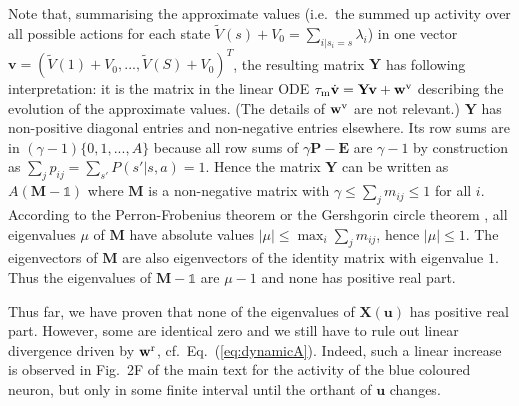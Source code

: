 \documentclass[a4paper,11pt]{article}
\newcommand{\vw}{{\mathbf w}}
\newcommand{\vu}{{\mathbf u}}
\newcommand{\vv}{{\mathbf v}}
\newcommand{\vX}{{\mathbf X}}
\newcommand{\vY}{{\mathbf Y}}
\newcommand{\vE}{{\mathbf E}}
\newcommand{\vP}{{\mathbf P}}
\newcommand{\vM}{{\mathbf M}}
\newcommand{\tV}{{\tilde{V}}}
\begin{document}
Note that, summarising the approximate values (i.e.\ the summed up activity over all possible actions for each state $\tV(s)+V_0=\sum_{i|s_i=s} \lambda_i$) in one vector $\vv=(\tV(1)+V_0,...,\tV(S)+V_0)^T$, the resulting matrix $\vY$ has following interpretation: it is the matrix in the linear ODE $\tau_{\rm m}\dot{\vv} = \vY \vv + \vw^{\rm v}$ describing the evolution of the approximate values. (The details of $\vw^{\rm v}$ are not relevant.)
$\vY$ has non-positive diagonal entries and non-negative entries elsewhere. Its row sums are in $(\gamma-1)\{0,1,...,A\}$ because all row sums of $\gamma\vP-\vE$ are  $\gamma-1$ by construction as $\sum_j p_{ij}=\sum_{s'}P(s'|s,a)=1$.
Hence the matrix $\vY$ can be written as $A(\vM-\mathds{1})$ where $\vM$ is a non-negative matrix with $\gamma\leq\sum_j m_{ij}\leq1$ for all $i$. According to the Perron-Frobenius theorem \cite{Perron1907} or the Gershgorin circle theorem \cite{Gerschgorin1931}, all eigenvalues $\mu$ of $\vM$ have absolute values $|\mu|\leq\max_i\sum_j m_{ij}$, hence $|\mu|\leq1$. The eigenvectors of $\vM$ are also eigenvectors of the identity matrix with eigenvalue $1$. Thus the eigenvalues of $\vM-\mathds{1}$ are $\mu-1$ and none has positive real part.


Thus far, we have proven that none of the eigenvalues of $\vX(\vu)$ has positive real part. However, some are identical zero and we still have to rule out linear divergence driven by $\vw^{\rm r}$, cf.\ Eq.~(\ref{eq:dynamicA}). Indeed, such a linear increase is observed in Fig.~2F of the main text for the activity of the blue coloured neuron, but only in some finite interval until the orthant of $\vu$ changes. 
\end{document}
